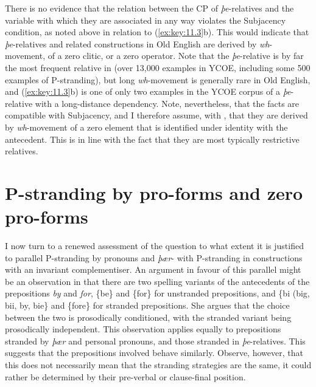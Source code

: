 \documentclass[output=paper]{langsci/langscibook}
\begin{document}
There is no evidence that the relation between the CP of \textit{þe}-relatives
and the variable with which they are associated in any way violates the
Subjacency condition, as noted above in relation to (\ref{ex:key:11.3}b). This
would indicate that \textit{þe}-relatives and related constructions in Old
English are derived by \textit{wh}-movement, of a zero
clitic, or a zero operator. Note that the \textit{þe}-relative is
by far the most frequent relative in  (over 13,000 examples in
YCOE, including some 500 examples of P-stranding),  but long
\textit{wh}-movement is generally rare in Old English, and (\ref{ex:key:11.3}b)
is one of only two examples in the YCOE corpus of a \textit{þe}-relative with a
long-distance dependency. Note, nevertheless, that the facts are compatible
with Subjacency, and I therefore assume, with \citet{vanKemenade1987}, that
they are derived by \textit{wh}-movement of a zero element
that is identified under identity with the antecedent. This is in line with the
fact that they are most typically restrictive relatives.

\section{P-stranding by pro-forms and zero pro-forms}

I now turn to a renewed assessment of the question to what extent it is
justified to parallel P-stranding by pronouns and \textit{þær}- with
P-stranding  in constructions with an invariant complementiser. An argument in
favour of this parallel might be an observation in \citet{Alcorn2014} that
there are two spelling variants of the  antecedents of the
prepositions \textit{by} and \textit{for}, \{be\} and \{for\} for unstranded
prepositions, and \{bi (big, bii, by, bie\} and \{fore\} for stranded
prepositions.  She argues that the choice between the two is prosodically
conditioned, with the stranded variant being prosodically independent. This
observation applies equally to prepositions stranded by \textit{þær} and
personal pronouns, and those stranded in \textit{þe}-relatives. This suggests
that the prepositions involved behave similarly. Observe, however, that this
does not necessarily mean that the stranding strategies are the same, it could
rather be determined by their pre-verbal or clause-final position.
\end{document}
